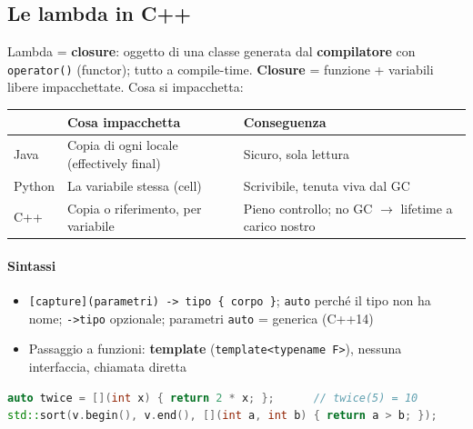 \documentclass[12pt]{extarticle}
\begin{document}
\subsection{Le lambda in C++}
Lambda = \textbf{closure}: oggetto di una classe generata dal \textbf{compilatore} con \texttt{operator()} (functor); tutto a compile-time. \textbf{Closure} = funzione + variabili libere impacchettate. Cosa si impacchetta:
\begin{center}
\small
\begin{tabular}{p{2.0cm}p{6.6cm}p{6.0cm}}
    \toprule
    & \textbf{Cosa impacchetta} & \textbf{Conseguenza} \\
    \midrule
    Java & Copia di ogni locale (effectively final) & Sicuro, sola lettura \\
    \addlinespace
    Python & La variabile stessa (cell) & Scrivibile, tenuta viva dal GC \\
    \addlinespace
    C++ & Copia o riferimento, per variabile & Pieno controllo; no GC $\rightarrow$ lifetime a carico nostro \\
    \bottomrule
\end{tabular}
\end{center}

\paragraph{Sintassi}
\begin{itemize}
    \item \texttt{[capture](parametri) -> tipo \{ corpo \}}; \texttt{auto} perché il tipo non ha nome; \texttt{->tipo} opzionale; parametri \texttt{auto} = generica (C++14)
    \item Passaggio a funzioni: \textbf{template} (\texttt{template<typename F>}), nessuna interfaccia, chiamata diretta
\end{itemize}
\begin{lstlisting}[language=C++]
auto twice = [](int x) { return 2 * x; };      // twice(5) = 10
std::sort(v.begin(), v.end(), [](int a, int b) { return a > b; });
\end{lstlisting}
\end{document}
